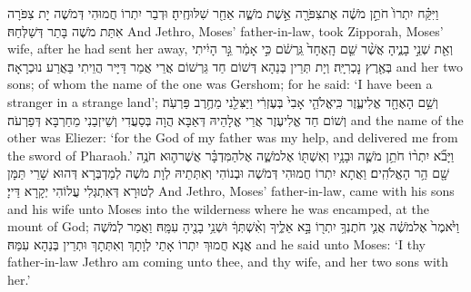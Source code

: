 {וַיִּקַּ֗ח יִתְרוֹ֙ חֹתֵ֣ן מֹשֶׁ֔ה אֶת\maqqaf צִפֹּרָ֖ה אֵ֣שֶׁת מֹשֶׁ֑ה אַחַ֖ר שִׁלּוּחֶֽיהָ׃}
{וּדְבַר יִתְרוֹ חֲמוּהִי דְּמֹשֶׁה יָת צִפֹּרָה אִתַּת מֹשֶׁה בָּתַר דְּשַׁלְּחַהּ׃}
{And Jethro, Moses’ father-in-law, took Zipporah, Moses’ wife, after he had sent her away,}{}
{וְאֵ֖ת שְׁנֵ֣י בָנֶ֑יהָ אֲשֶׁ֨ר שֵׁ֤ם הָֽאֶחָד֙ גֵּֽרְשֹׁ֔ם כִּ֣י אָמַ֔ר גֵּ֣ר הָיִ֔יתִי בְּאֶ֖רֶץ נׇכְרִיָּֽה׃}
{וְיָת תְּרֵין בְּנַהָא דְּשׁוֹם חַד גֵּרְשׁוֹם אֲרֵי אֲמַר דַּיָּיר הֲוֵיתִי בַּאֲרַע נוּכְרָאָה׃}
{and her two sons; of whom the name of the one was Gershom; for he said: ‘I have been a stranger in a strange land’;}{}
{וְשֵׁ֥ם הָאֶחָ֖ד אֱלִיעֶ֑זֶר כִּֽי\maqqaf אֱלֹהֵ֤י אָבִי֙ בְּעֶזְרִ֔י וַיַּצִּלֵ֖נִי מֵחֶ֥רֶב פַּרְעֹֽה׃}
{וְשׁוֹם חַד אֱלִיעֶזֶר אֲרֵי אֱלָהֵיהּ דְּאַבָּא הֲוָה בְּסַעֲדִי וְשֵׁיזְבַנִי מֵחַרְבָּא דְּפַרְעֹה׃}
{and the name of the other was Eliezer: ‘for the God of my father was my help, and delivered me from the sword of Pharaoh.’}{}
{וַיָּבֹ֞א יִתְר֨וֹ חֹתֵ֥ן מֹשֶׁ֛ה וּבָנָ֥יו וְאִשְׁתּ֖וֹ אֶל\maqqaf מֹשֶׁ֑ה אֶל\maqqaf הַמִּדְבָּ֗ר אֲשֶׁר\maqqaf ה֛וּא חֹנֶ֥ה שָׁ֖ם הַ֥ר הָאֱלֹהִֽים׃}
{וַאֲתָא יִתְרוֹ חֲמוּהִי דְּמֹשֶׁה וּבְנוֹהִי וְאִתְּתֵיהּ לְוָת מֹשֶׁה לְמַדְבְּרָא דְּהוּא שָׁרֵי תַּמָּן לְטוּרָא דְּאִתְגְּלִי עֲלוֹהִי יְקָרָא דַּייָ׃}
{And Jethro, Moses’ father-in-law, came with his sons and his wife unto Moses into the wilderness where he was encamped, at the mount of God;}{}
{וַיֹּ֙אמֶר֙ אֶל\maqqaf מֹשֶׁ֔ה אֲנִ֛י חֹתֶנְךָ֥ יִתְר֖וֹ בָּ֣א אֵלֶ֑יךָ וְאִ֨שְׁתְּךָ֔ וּשְׁנֵ֥י בָנֶ֖יהָ עִמָּֽהּ׃}
{וַאֲמַר לְמֹשֶׁה אֲנָא חֲמוּךְ יִתְרוֹ אָתֵי לְוָתָךְ וְאִתְּתָךְ וּתְרֵין בְּנַהָא עִמַּהּ׃}
{and he said unto Moses: ‘I thy father-in-law Jethro am coming unto thee, and thy wife, and her two sons with her.’}{}
